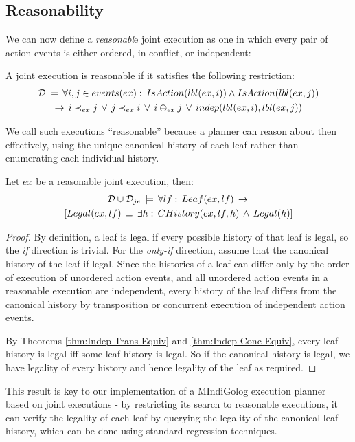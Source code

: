 \subsection{Reasonability}

We can now define a \emph{reasonabl}e joint execution as one in which
every pair of action events is either ordered, in conflict, or independent:

\begin{defnL}
 A joint execution is reasonable
if it satisfies the following restriction:\begin{multline*}
\mathcal{D}\,\models\,\forall i,j\in events(ex):\, IsAction(lbl(ex,i))\wedge IsAction(lbl(ex,j))\\
\rightarrow\, i\prec_{ex}j\,\vee\, j\prec_{ex}i\,\vee\, i\oplus_{ex}j\,\vee\, indep(lbl(ex,i),lbl(ex,j))\end{multline*}

\end{defnL}
We call such executions {}``reasonable'' because a planner can reason
about then effectively, using the unique canonical history of each
leaf rather than enumerating each individual history.

\begin{thm}
Let $ex$ be a reasonable joint execution, then:\begin{multline*}
\mathcal{D}\cup\mathcal{D}_{je}\,\models\,\forall lf:\, Leaf(ex,lf)\,\rightarrow\,\\
\left[Legal(ex,lf)\,\equiv\,\exists h:\, CHistory(ex,lf,h)\,\wedge\, Legal(h)\right]\end{multline*}

\end{thm}
\begin{proof}
By definition, a leaf is legal if every possible history of that leaf
is legal, so the \emph{if} direction is trivial. For the \emph{only-if}
direction, assume that the canonical history of the leaf if legal.
Since the histories of a leaf can differ only by the order of execution
of unordered action events, and all unordered action events in a reasonable
execution are independent, every history of the leaf differs from
the canonical history by transposition or concurrent execution of
independent action events.

By Theorems \ref{thm:Indep-Trans-Equiv} and \ref{thm:Indep-Conc-Equiv},
every leaf history is legal iff some leaf history is legal. So if
the canonical history is legal, we have legality of every history
and hence legality of the leaf as required.
\end{proof}
This result is key to our implementation of a MIndiGolog execution
planner based on joint executions - by restricting its search to reasonable
executions, it can verify the legality of each leaf by querying the
legality of the canonical leaf history, which can be done using standard
regression techniques. 

